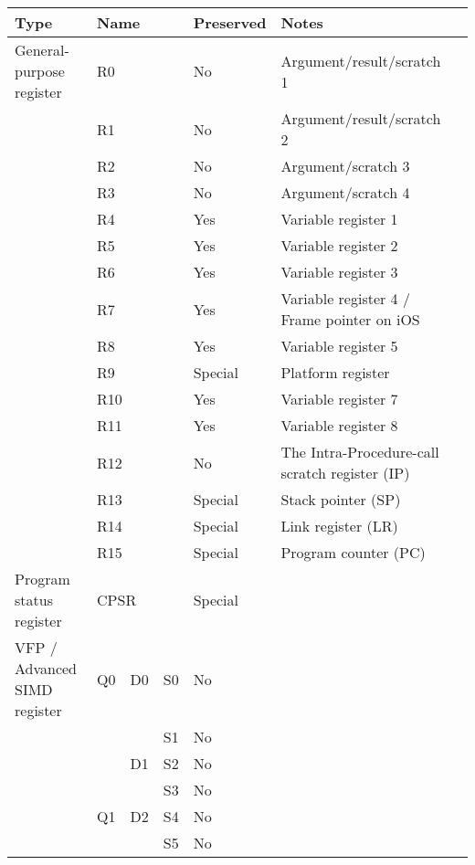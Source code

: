 	\begin{tabular}{lllllll}
		\toprule
		Type						&	\multicolumn{3}{l}{Name}	&	Preserved	&	Notes						\\
		\midrule
	 	General-purpose register	&	\multicolumn{3}{l}{R0}		&	No			&	Argument/result/scratch 1   \\
							 		&	\multicolumn{3}{l}{R1}		&	No			&	Argument/result/scratch 2   \\
							 		&	\multicolumn{3}{l}{R2}		&	No			&	Argument/scratch 3			\\
							 		&	\multicolumn{3}{l}{R3}		&	No			&	Argument/scratch 4			\\
							 		&	\multicolumn{3}{l}{R4}		&	Yes			&	Variable register 1			\\
							 		&	\multicolumn{3}{l}{R5}		&	Yes			&	Variable register 2			\\
							 		&	\multicolumn{3}{l}{R6}		&	Yes			&	Variable register 3			\\
							 		&	\multicolumn{3}{l}{R7}		&	Yes			&	Variable register 4 / Frame pointer on iOS	\\
							 		&	\multicolumn{3}{l}{R8}		&	Yes			&	Variable register 5			\\
							 		&	\multicolumn{3}{l}{R9}		&	Special		&	Platform register			\\
							 		&	\multicolumn{3}{l}{R10}		&	Yes			&	Variable register 7			\\
							 		&	\multicolumn{3}{l}{R11}		&	Yes			&	Variable register 8			\\
							 		&	\multicolumn{3}{l}{R12}		&	No			&	The Intra-Procedure-call scratch register (IP)	\\
							 		&	\multicolumn{3}{l}{R13}		&	Special		&	Stack pointer (SP)	 		\\
							 		&	\multicolumn{3}{l}{R14}		&	Special		&	Link register (LR)	 		\\
							 		&	\multicolumn{3}{l}{R15}		&	Special		&	Program counter (PC) 		\\
		Program status register		&	\multicolumn{3}{l}{CPSR}	&	Special		&						 		\\
		VFP / Advanced SIMD register&	Q0	&	D0	&	S0			&	No			&	  		\\
									&		&		&	S1			&	No			&	  		\\
									&		&	D1	&	S2			&	No			&	  		\\
									&		&		&	S3			&	No			&	  		\\
									&	Q1	&	D2	&	S4			&	No			&	  		\\
									&		&		&	S5			&	No			&	  		\\

\end{tabular}

